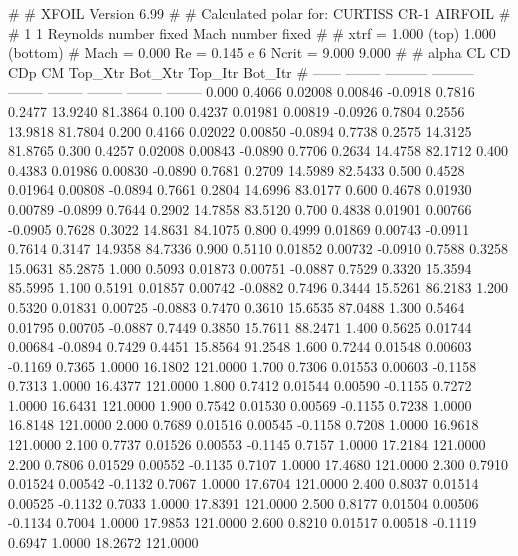 #  
#       XFOIL         Version 6.99
#  
# Calculated polar for: CURTISS CR-1 AIRFOIL                            
#  
# 1 1 Reynolds number fixed          Mach number fixed         
#  
# xtrf =   1.000 (top)        1.000 (bottom)  
# Mach =   0.000     Re =     0.145 e 6     Ncrit =   9.000  9.000
#  
#   alpha    CL        CD       CDp       CM     Top_Xtr  Bot_Xtr  Top_Itr  Bot_Itr
#  ------ -------- --------- --------- -------- -------- -------- -------- --------
   0.000   0.4066   0.02008   0.00846  -0.0918   0.7816   0.2477  13.9240  81.3864
   0.100   0.4237   0.01981   0.00819  -0.0926   0.7804   0.2556  13.9818  81.7804
   0.200   0.4166   0.02022   0.00850  -0.0894   0.7738   0.2575  14.3125  81.8765
   0.300   0.4257   0.02008   0.00843  -0.0890   0.7706   0.2634  14.4758  82.1712
   0.400   0.4383   0.01986   0.00830  -0.0890   0.7681   0.2709  14.5989  82.5433
   0.500   0.4528   0.01964   0.00808  -0.0894   0.7661   0.2804  14.6996  83.0177
   0.600   0.4678   0.01930   0.00789  -0.0899   0.7644   0.2902  14.7858  83.5120
   0.700   0.4838   0.01901   0.00766  -0.0905   0.7628   0.3022  14.8631  84.1075
   0.800   0.4999   0.01869   0.00743  -0.0911   0.7614   0.3147  14.9358  84.7336
   0.900   0.5110   0.01852   0.00732  -0.0910   0.7588   0.3258  15.0631  85.2875
   1.000   0.5093   0.01873   0.00751  -0.0887   0.7529   0.3320  15.3594  85.5995
   1.100   0.5191   0.01857   0.00742  -0.0882   0.7496   0.3444  15.5261  86.2183
   1.200   0.5320   0.01831   0.00725  -0.0883   0.7470   0.3610  15.6535  87.0488
   1.300   0.5464   0.01795   0.00705  -0.0887   0.7449   0.3850  15.7611  88.2471
   1.400   0.5625   0.01744   0.00684  -0.0894   0.7429   0.4451  15.8564  91.2548
   1.600   0.7244   0.01548   0.00603  -0.1169   0.7365   1.0000  16.1802 121.0000
   1.700   0.7306   0.01553   0.00603  -0.1158   0.7313   1.0000  16.4377 121.0000
   1.800   0.7412   0.01544   0.00590  -0.1155   0.7272   1.0000  16.6431 121.0000
   1.900   0.7542   0.01530   0.00569  -0.1155   0.7238   1.0000  16.8148 121.0000
   2.000   0.7689   0.01516   0.00545  -0.1158   0.7208   1.0000  16.9618 121.0000
   2.100   0.7737   0.01526   0.00553  -0.1145   0.7157   1.0000  17.2184 121.0000
   2.200   0.7806   0.01529   0.00552  -0.1135   0.7107   1.0000  17.4680 121.0000
   2.300   0.7910   0.01524   0.00542  -0.1132   0.7067   1.0000  17.6704 121.0000
   2.400   0.8037   0.01514   0.00525  -0.1132   0.7033   1.0000  17.8391 121.0000
   2.500   0.8177   0.01504   0.00506  -0.1134   0.7004   1.0000  17.9853 121.0000
   2.600   0.8210   0.01517   0.00518  -0.1119   0.6947   1.0000  18.2672 121.0000
